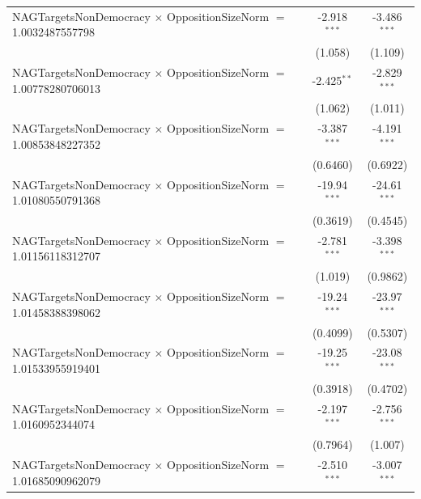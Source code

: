 \begin{tabular}{lcc}
   NAGTargetsNonDemocracy $\times$ OppositionSizeNorm $=$ 1.0032487557798       & -2.918$^{***}$       & -3.486$^{***}$\\   
                                                                                & (1.058)              & (1.109)\\   
   NAGTargetsNonDemocracy $\times$ OppositionSizeNorm $=$ 1.00778280706013      & -2.425$^{**}$        & -2.829$^{***}$\\   
                                                                                & (1.062)              & (1.011)\\   
   NAGTargetsNonDemocracy $\times$ OppositionSizeNorm $=$ 1.00853848227352      & -3.387$^{***}$       & -4.191$^{***}$\\   
                                                                                & (0.6460)             & (0.6922)\\   
   NAGTargetsNonDemocracy $\times$ OppositionSizeNorm $=$ 1.01080550791368      & -19.94$^{***}$       & -24.61$^{***}$\\   
                                                                                & (0.3619)             & (0.4545)\\   
   NAGTargetsNonDemocracy $\times$ OppositionSizeNorm $=$ 1.01156118312707      & -2.781$^{***}$       & -3.398$^{***}$\\   
                                                                                & (1.019)              & (0.9862)\\   
   NAGTargetsNonDemocracy $\times$ OppositionSizeNorm $=$ 1.01458388398062      & -19.24$^{***}$       & -23.97$^{***}$\\   
                                                                                & (0.4099)             & (0.5307)\\   
   NAGTargetsNonDemocracy $\times$ OppositionSizeNorm $=$ 1.01533955919401      & -19.25$^{***}$       & -23.08$^{***}$\\   
                                                                                & (0.3918)             & (0.4702)\\   
   NAGTargetsNonDemocracy $\times$ OppositionSizeNorm $=$ 1.0160952344074       & -2.197$^{***}$       & -2.756$^{***}$\\   
                                                                                & (0.7964)             & (1.007)\\   
   NAGTargetsNonDemocracy $\times$ OppositionSizeNorm $=$ 1.01685090962079      & -2.510$^{***}$       & -3.007$^{***}$\\   

\end{tabular}
